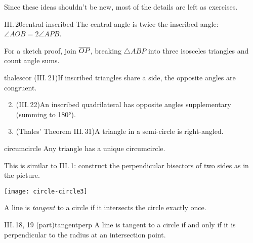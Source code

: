Since these ideas shouldn't be new, most of the details are left as exercises.

\begin{thm}{III.\,20}{central-inscribed}
	The central angle is twice the inscribed angle: $\angle AOB=2\angle APB$.
\end{thm}

For a sketch proof, join $\overline{OP}$, breaking $\triangle ABP$ into three isosceles triangles and count angle sums.

\begin{cor}{}{thalescor}
	\exstart (III.\,21)\lstsp If inscribed triangles share a side, the opposite angles are congruent.
	\begin{enumerate}\setcounter{enumi}{1}
		\item (III.\,22)\lstsp An inscribed quadrilateral has opposite angles supplementary (summing to \ang{180}).
		\item (Thales' Theorem III.\,31)\lstsp A triangle in a semi-circle is right-angled.
	\end{enumerate}
\end{cor}

\goodbreak

\begin{minipage}[t]{0.62\linewidth}\vspace{0pt}
	\begin{thm}{}{circumcircle}
		Any triangle has a unique circumcircle.
	\end{thm}
	
	This is similar to III.\,1: construct the perpendicular bisectors of two sides as in the picture.
\end{minipage}
\hfill
\begin{minipage}[t]{0.37\linewidth}\vspace{-8pt}
	\flushright
	\texttt{[image: circle-circle3]}
\end{minipage}


\begin{defn}{}{}
	A line is \emph{tangent} to a circle if it intersects the circle exactly once.
\end{defn}

\begin{thm}{III.\,18, 19 (part)}{tangentperp}
	A line is tangent to a circle if and only if it is perpendicular to the radius at an intersection point.
\end{thm}

